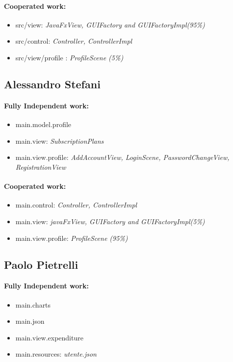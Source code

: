 \documentclass[a4paper,12pt]{report}
\begin{document}
\paragraph*{Cooperated work:}
\begin{itemize}
     \item src/view: \textit{JavaFxView, GUIFactory and GUIFactoryImpl(95\%)}
     \item src/control: \textit{Controller, ControllerImpl}
     \item src/view/profile : \textit{ProfileScene (5\%)}
\end{itemize}

\subsection{Alessandro Stefani}
\paragraph*{Fully Independent work:}
\begin{itemize}
    \item main.model.profile
    \item main.view: \textit{SubscriptionPlans}
    \item main.view.profile: \textit{AddAccountView, LoginScene, PasswordChangeView, RegistrationView}
\end{itemize}
\paragraph*{Cooperated work:}
\begin{itemize}
    \item main.control: \textit{Controller, ControllerImpl}
    \item main.view: \textit{javaFxView, GUIFactory and GUIFactoryImpl(5\%)}
    \item main.view.profile: \textit{ProfileScene (95\%)}
\end{itemize}

\subsection{Paolo Pietrelli}
\paragraph*{Fully Independent work:}
\begin{itemize}
    \item main.charts
    \item main.json
    \item main.view.expenditure
    \item main.resources: \textit{utente.json}
\end{itemize}
\end{document}

